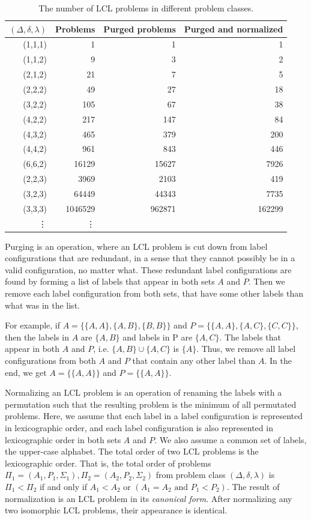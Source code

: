 \begin{table}[H]
  \centering
  \begin{tabular}{r|rrr}
    \toprule
    $(\Delta, \delta, \lambda)$ & Problems & Purged problems & Purged and normalized\\
    \midrule
    (1,1,1)& 1 & 1 & 1 \\
    (1,1,2)& 9 & 3 & 2 \\
    (2,1,2)& 21 & 7 & 5 \\
    (2,2,2)& 49 & 27 & 18 \\
    (3,2,2)& 105 & 67 & 38 \\
    (4,2,2)& 217 & 147 & 84 \\
    (4,3,2)& 465 & 379 & 200 \\
    (4,4,2)& 961 & 843 & 446 \\
    (6,6,2)& 16129 & 15627 & 7926 \\
    (2,2,3)& 3969 & 2103 & 419 \\
    (3,2,3)& 64449 & 44343 & 7735 \\
    (3,3,3)& 1046529 & 962871 & 162299 \\
    \vdots & \vdots\\
    \bottomrule
  \end{tabular}
  \caption{%
    The number of LCL problems in different problem classes.
  }
  \label{tbl:lcl_problem_classes}
\end{table}

Purging is an operation, where an LCL problem is cut down from label configurations that are redundant, in a sense that they cannot possibly be in a valid configuration, no matter what.
These redundant label configurations are found by forming a list of labels that appear in both sets $A$ and $P$.
Then we remove each label configuration from both sets, that have some other labels than what was in the list.

For example, if $A=\{\{A, A\}, \{A, B\}, \{B, B\}\}$ and $P=\{\{A, A\}, \{A, C\}, \{C, C\}\}$, then the labels in $A$ are $\{A, B\}$ and labels in P are $\{A, C\}$.
The labels that appear in both $A$ and $P$, i.e.  $\{A, B\} \cup \{A, C\} $ is $\{A\}$.
Thus, we remove all label configurations from both $A$ and $P$ that contain any other label than $A$.
In the end, we get $A=\{\{A, A\}\}$ and $P=\{\{A, A\}\}$.


Normalizing an LCL problem is an operation of renaming the labels with a permutation such that the resulting problem is the minimum of all permutated problems.
Here, we assume that each label in a label configuration is represented in lexicographic order, and each label configuration is also represented in lexicographic order in both sets $A$ and $P$.
We also assume a common set of labels, the upper-case alphabet.
The total order of two LCL problems is the lexicographic order.
That is, the total order of problems $\Pi_1=(A_1, P_1, \Sigma_1), \Pi_2=(A_2, P_2, \Sigma_2)$ from problem class $(\Delta, \delta, \lambda)$ is $\Pi_1 < \Pi_2$ if and only if $A_1 < A_2$ or $(A_1 = A_2 \text{ and } P_1 < P_2)$.
The result of normalization is an LCL problem in its \emph{canonical form}.
After normalizing any two isomorphic LCL problems, their appearance is identical.

